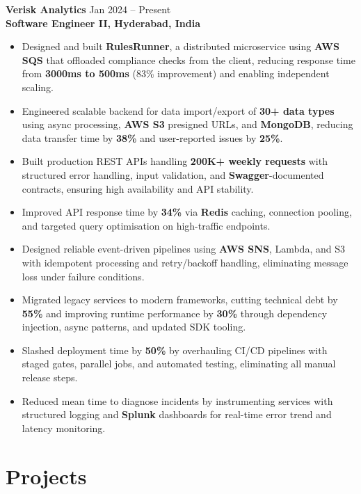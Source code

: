 \documentclass[a4paper,10pt]{article}
\begin{document}
\textbf{Verisk Analytics} \hfill Jan 2024 -- Present \\
\textbf{Software Engineer II, Hyderabad, India}
\begin{itemize}[leftmargin=*]
    \item Designed and built \textbf{RulesRunner}, a distributed microservice using \textbf{AWS SQS} that offloaded compliance checks from the client, reducing response time from \textbf{3000ms to 500ms} (83\% improvement) and enabling independent scaling.
    \item Engineered scalable backend for data import/export of \textbf{30+ data types} using async processing, \textbf{AWS S3} presigned URLs, and \textbf{MongoDB}, reducing data transfer time by \textbf{38\%} and user-reported issues by \textbf{25\%}.
    \item Built production REST APIs handling \textbf{200K+ weekly requests} with structured error handling, input validation, and \textbf{Swagger}-documented contracts, ensuring high availability and API stability.
    \item Improved API response time by \textbf{34\%} via \textbf{Redis} caching, connection pooling, and targeted query optimisation on high-traffic endpoints.
    \item Designed reliable event-driven pipelines using \textbf{AWS SNS}, Lambda, and S3 with idempotent processing and retry/backoff handling, eliminating message loss under failure conditions.
    \item Migrated legacy services to modern frameworks, cutting technical debt by \textbf{55\%} and improving runtime performance by \textbf{30\%} through dependency injection, async patterns, and updated SDK tooling.
    \item Slashed deployment time by \textbf{50\%} by overhauling CI/CD pipelines with staged gates, parallel jobs, and automated testing, eliminating all manual release steps.
    \item Reduced mean time to diagnose incidents by instrumenting services with structured logging and \textbf{Splunk} dashboards for real-time error trend and latency monitoring.
\end{itemize}

\section*{Projects}
\end{document}
